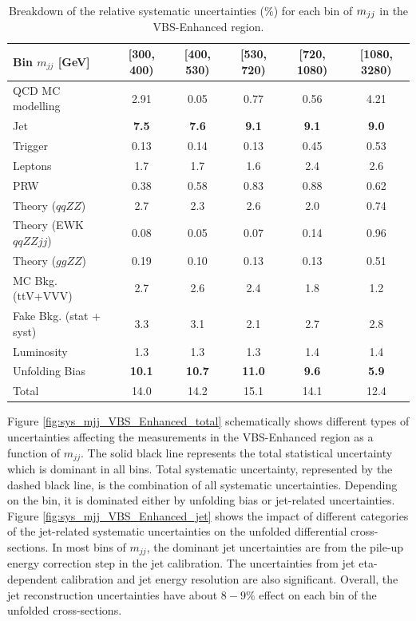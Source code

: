 \begin{table}[!htbp]
\centering
\begin{tabular}{| l || c | c | c | c | c | }
\hline \hline
Bin $m_{jj}$ [GeV] & [300, 400) & [400, 530) & [530, 720) & [720, 1080) & [1080, 3280)\\
\hline
QCD MC modelling & 2.91 & 0.05 & 0.77 & 0.56 & 4.21 \\
Jet & \textbf{7.5} & \textbf{7.6} & \textbf{9.1} & \textbf{9.1} & \textbf{9.0}\\
Trigger & 0.13 & 0.14 & 0.13 & 0.45 & 0.53\\
Leptons & 1.7 & 1.7 & 1.6 & 2.4 & 2.6 \\
PRW & 0.38 & 0.58 & 0.83 & 0.88 & 0.62\\
Theory ($qqZZ$) & 2.7 & 2.3 & 2.6 & 2.0 & 0.74\\
Theory (EWK $qqZZjj$) & 0.08 & 0.05 & 0.07 & 0.14 & 0.96\\
Theory ($ggZZ$) & 0.19 & 0.10 & 0.13 & 0.13 & 0.51\\
MC Bkg. (ttV+VVV) & 2.7 & 2.6 & 2.4 & 1.8 & 1.2\\
Fake Bkg. (stat + syst) & 3.3 & 3.1 & 2.1 & 2.7 & 2.8\\
Luminosity & 1.3 & 1.3 & 1.3 & 1.4 & 1.4\\
Unfolding Bias & \textbf{10.1} & \textbf{10.7} & \textbf{11.0} & \textbf{9.6} & \textbf{5.9}\\
\hline
Total & 14.0 & 14.2 & 15.1 & 14.1 & 12.4\\
\hline
\end{tabular}
\caption{Breakdown of the relative systematic uncertainties ($\%$) for each bin of $m_{jj}$ in the VBS-Enhanced region. \label{tab:systematics_mjj_VBS_Enhanced}}
\end{table}

Figure \ref{fig:sys_mjj_VBS_Enhanced_total} schematically shows different types of uncertainties affecting the measurements in the VBS-Enhanced region as a function of $m_{jj}$. The solid black line represents the total statistical uncertainty which is dominant in all bins. Total systematic uncertainty, represented by the dashed black line, is the combination of all systematic uncertainties. Depending on the bin, it is dominated either by unfolding bias or jet-related uncertainties. Figure \ref{fig:sys_mjj_VBS_Enhanced_jet} shows the impact of different categories of the jet-related systematic uncertainties on the unfolded differential cross-sections. In most bins of $m_{jj}$, the dominant jet uncertainties are from the pile-up energy correction step in the jet calibration. The uncertainties from jet eta-dependent calibration and jet energy resolution are also significant. Overall, the jet reconstruction uncertainties have about $8-9\%$ effect on each bin of the unfolded cross-sections.

